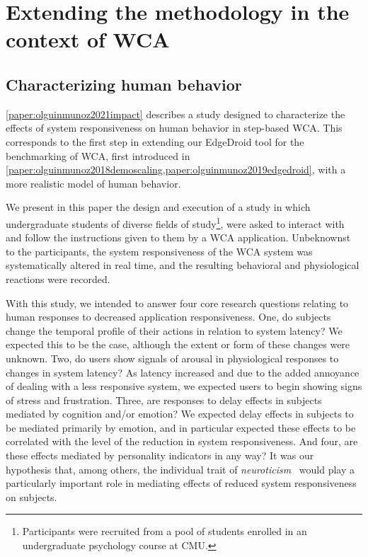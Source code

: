 \section{Extending the methodology in the context of \gls{WCA}}


\subsection{Characterizing human behavior}

\cref{paper:olguinmunoz2021impact} describes a study designed to characterize the effects of system responsiveness on human behavior in step-based \gls{WCA}.
This corresponds to the first step in extending our EdgeDroid tool for the benchmarking of \gls{WCA}, first introduced in \cref{paper:olguinmunoz2018demoscaling,paper:olguinmunoz2019edgedroid}, with a more realistic model of human behavior.

We present in this paper the design and execution of a study in which undergraduate students of diverse fields of
study\footnote{%
    Participants were recruited from a pool of students enrolled in an undergraduate psychology course at \gls{CMU}.
}, were asked to interact with and follow the instructions given to them by a \gls{WCA} application.
Unbeknownst to the participants, the system responsiveness of the \gls{WCA} system was systematically altered in real time, and the resulting behavioral and physiological reactions were recorded.

With this study, we intended to answer four core research questions relating to human responses to decreased application responsiveness.
One, do subjects change the temporal profile of their actions in relation to system latency?
We expected this to be the case, although the extent or form of these changes were unknown.
Two, do users show signals of arousal in physiological responses to changes in system latency?
As latency increased and due to the added annoyance of dealing with a less responsive system, we expected users to begin showing signs of stress and frustration.
Three, are responses to delay effects in subjects mediated by cognition and/or emotion?
We expected delay effects in subjects to be mediated primarily by emotion, and in particular expected these effects to be correlated with the level of the reduction in system responsiveness.
And four, are these effects mediated by personality indicators in any way?
It was our hypothesis that, among others, the individual trait of \emph{neuroticism}~\cite{john1999big} would play a particularly important role in mediating effects of reduced system responsiveness on subjects.

